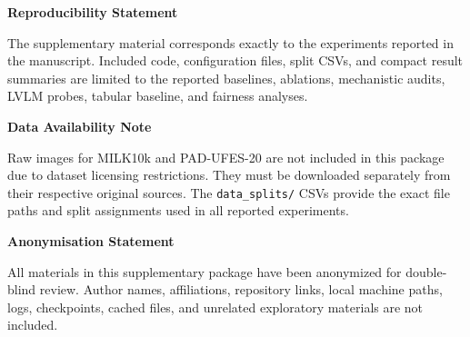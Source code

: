 \documentclass[10pt]{article}
\begin{document}
\vspace{7pt}
\normalsize
{\bfseries Reproducibility Statement}

The supplementary material corresponds exactly to the experiments reported in the manuscript. Included code, configuration files, split CSVs, and compact result summaries are limited to the reported baselines, ablations, mechanistic audits, LVLM probes, tabular baseline, and fairness analyses.

\vspace{4pt}
{\bfseries Data Availability Note}

Raw images for MILK10k and PAD-UFES-20 are not included in this package due to dataset licensing restrictions. They must be downloaded separately from their respective original sources. The \texttt{data\_splits/} CSVs provide the exact file paths and split assignments used in all reported experiments.

\vspace{4pt}
{\bfseries Anonymisation Statement}

All materials in this supplementary package have been anonymized for double-blind review. Author names, affiliations, repository links, local machine paths, logs, checkpoints, cached files, and unrelated exploratory materials are not included.
\end{document}
